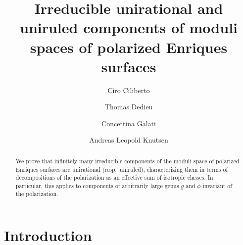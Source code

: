 \documentclass[11pt]{amsart}
\theoremstyle{definition}
\begin{document}
  
\title[Moduli spaces of polarized Enriques surfaces]
{Irreducible unirational and uniruled components of moduli spaces of polarized Enriques surfaces} 



\author[C.~Ciliberto]{Ciro Ciliberto}
\address{Ciro Ciliberto, Dipartimento di Matematica, Universit\`a di Roma Tor Vergata, Via della Ricerca Scientifica, 00173 Roma, Italy}

\author[T.~Dedieu]{Thomas Dedieu}
\address{Thomas Dedieu,
Institut de Math\'ematiques de Toulouse~; UMR5219.
Universit\'e de Toulouse~; CNRS.
UPS IMT, F-31062 Toulouse Cedex 9, France} 

\author[C.~Galati]{Concettina Galati}
\address{Concettina Galati, Dipartimento di Matematica e Informatica, Universit\`a della \linebreak Calabria, via P. Bucci, cubo 31B, 87036 Arcavacata di Rende (CS), Italy}

\author[A.~L.~Knutsen]{Andreas Leopold Knutsen}
\address{Andreas Leopold Knutsen, Department of Mathematics, University of Bergen, Postboks 7800,
5020 Bergen, Norway}








\begin{abstract}
  We \color{black} prove that infinitely many irreducible components of the moduli space of
polarized Enriques  surfaces are
unirational (resp.\ uniruled), characterizing them in terms of decompositions of the
polarization as  an effective  sum of isotropic classes. \color{black}
In particular,  this applies to components of  
arbitrarily large genus $g$ and $\phi$-invariant of the polarization.
\end{abstract}




\maketitle


\section{Introduction} \label{sec:ointro}
\end{document}
